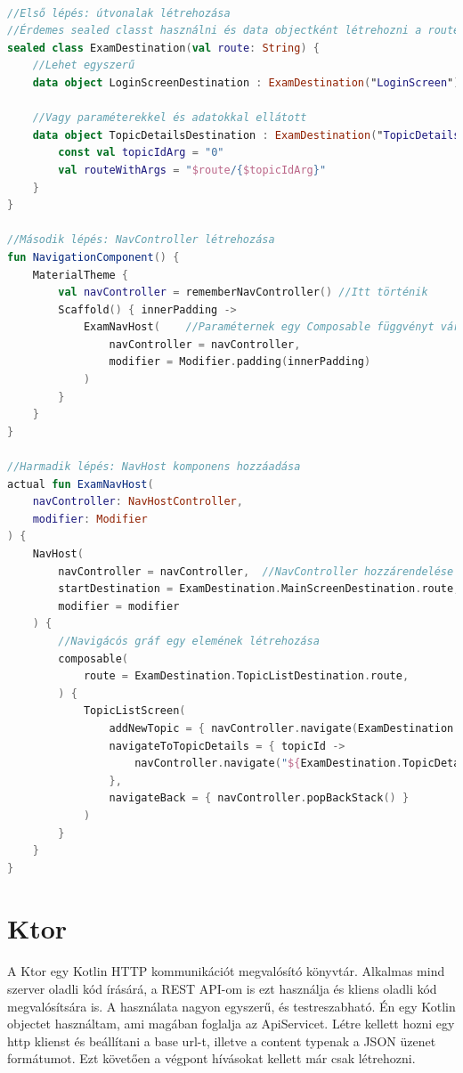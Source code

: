 \begin{lstlisting}[caption={Példa a Navigation használatára.}, label={lst:nav}, language=Kotlin]

//Első lépés: útvonalak létrehozása
//Érdemes sealed classt használni és data objectként létrehozni a routeokat
sealed class ExamDestination(val route: String) {
    //Lehet egyszerű
    data object LoginScreenDestination : ExamDestination("LoginScreen")

    //Vagy paraméterekkel és adatokkal ellátott
    data object TopicDetailsDestination : ExamDestination("TopicDetails") {
        const val topicIdArg = "0"
        val routeWithArgs = "$route/{$topicIdArg}"
    }
}

//Második lépés: NavController létrehozása
fun NavigationComponent() {
    MaterialTheme {
        val navController = rememberNavController() //Itt történik
        Scaffold() { innerPadding ->
            ExamNavHost(    //Paraméternek egy Composable függvényt vár, ezen belül is egy NavHost függvényt
                navController = navController,
                modifier = Modifier.padding(innerPadding)
            )
        }
    }
}

//Harmadik lépés: NavHost komponens hozzáadása
actual fun ExamNavHost(
    navController: NavHostController,
    modifier: Modifier
) {
    NavHost(
        navController = navController,  //NavController hozzárendelése
        startDestination = ExamDestination.MainScreenDestination.route, //Kezdő útvonal beállítása
        modifier = modifier
    ) {
        //Navigácós gráf egy elemének létrehozása
        composable(
            route = ExamDestination.TopicListDestination.route,
        ) {
            TopicListScreen(
                addNewTopic = { navController.navigate(ExamDestination.NewTopicDestination.route) },
                navigateToTopicDetails = { topicId ->
                    navController.navigate("${ExamDestination.TopicDetailsDestination.route}/${topicId}")
                },
                navigateBack = { navController.popBackStack() }
            )
        }
    }
}
\end{lstlisting}

\section{Ktor}
\label{sec:Ktor}

A Ktor egy Kotlin HTTP kommunikációt megvalósító könyvtár\cite{Ktor}. Alkalmas mind szerver oladli kód írásárá, a REST API-om is ezt használja és kliens oladli kód megvalósítsára is.
A használata nagyon egyszerű, és testreszabható.
Én egy Kotlin objectet használtam, ami magában foglalja az ApiServicet.
Létre kellett hozni egy http klienst és beállítani a base url-t, illetve a content typenak a JSON üzenet formátumot.
Ezt követően a végpont hívásokat kellett már csak létrehozni.


